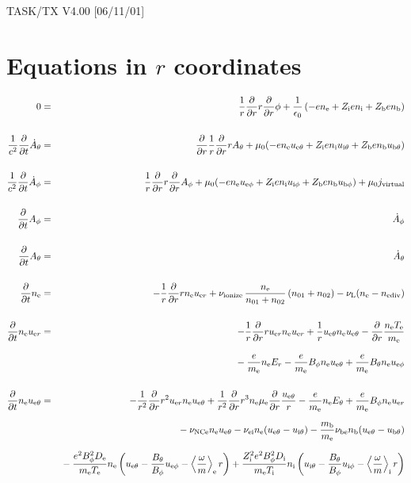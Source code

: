 \documentclass[11pt]{article}
\def\r#1{{\rm#1}}
\def\ddt{\frac{\partial}{\partial t}}
\def\ddr{\frac{\partial}{\partial r}}
\def\ave#1{\left\langle#1\right\rangle}
\def\me{m_\r{e}}
\def\mb{m_\r{b}}
\def\mue{\mu_\r{e}}
\def\De{D_\r{e}}
\def\Di{D_\r{i}}
\def\ne{n_\r{e}}
\def\ni{n_\r{i}}
\def\nb{n_\r{b}}
\def\uer{u_{\r{e}r}}
\def\ueth{u_{\r{e}\theta}}
\def\uith{u_{\r{i}\theta}}
\def\ubth{u_{\r{b}\theta}}
\def\ueph{u_{\r{e}\phi}}
\def\uiph{u_{\r{i}\phi}}
\def\ubph{u_{\r{b}\phi}}
\def\Er{E_r}
\def\Eth{E_\theta}
\def\Bth{B_\theta}
\def\Bph{B_\phi}
\def\Athd{\dot{A}_\theta}
\def\Aphd{\dot{A}_\phi}
\def\Ath{A_\theta}
\def\Aph{A_\phi}
\def\Te{T_\r{e}}
\def\Ti{T_\r{i}}
\def\nna{n_{01}}
\def\nnb{n_{02}}
\def\Zi{Z_\r{i}}
\def\Zb{Z_\r{b}}
\def\nuNCe{\nu_\r{NCe}}
\def\nuL{\nu_\r{L}}
\def\nuion{\nu_\r{ionize}}
\def\nediv{n_\r{ediv}}
\begin{document}
\begin{center}
TASK/TX V4.00 [06/11/01]
\end{center}

\section{Equations in $r$ coordinates}
\vspace{-5mm}

\begin{eqnarray}
%
%
  0 &=&
%
    \frac{1}{r} \ddr r \ddr \phi
%
  + \frac{1}{\epsilon_0}
%
    \left(-e \ne + \Zi e \ni + \Zb e \nb \right)
\\[5mm]
%
%
  \frac{1}{c^2} \ddt \Athd &=&
%
    \ddr \frac{1}{r} \ddr r \Ath
%
  + \mu_0 (-e \ne \ueth + \Zi e \ni \uith + \Zb e \nb \ubth)
\\[5mm]
%
%
  \frac{1}{c^2} \ddt \Aphd &=&
%
  \frac{1}{r} \ddr r \ddr \Aph
%
  + \mu_0 (-e \ne \ueph + \Zi e \ni \uiph + \Zb e \nb \ubph) + \mu_0 j_\r{virtual}
\\[5mm]
%
%
  \ddt \Aph &=&
%
  \Aphd
\\[5mm]
%
%
  \ddt \Ath &=&
%
  \Athd
\\[5mm]
%
%
  \ddt\ne &=&
%
  - \frac{1}{r} \ddr r \ne \uer 
%
  + \nuion\, \frac{\ne}{\nna+\nnb}\, (\nna+\nnb)
%
  - \nuL (\ne - \nediv)
\\[5mm]
%
%
  \ddt \ne \uer &=&
%
  - \frac{1}{r} \ddr r \uer \ne \uer
%
  + \frac{1}{r} \ueth \ne \ueth
%
  - \ddr \frac{\ne \Te}{\me}
\nonumber\\[3mm]&&{}
%
  - \frac{e}{\me} \ne \Er
%
  - \frac{e}{\me} \Bph \ne \ueth
%
  + \frac{e}{\me} \Bth \ne \ueph
\\[5mm]
%
%
  \ddt \ne \ueth &=&
%
  - \frac{1}{r^2} \ddr r^2 \uer \ne \ueth
%
  + \frac{1}{r^2} \ddr r^3 \ne \mue \ddr \frac{\ueth}{r}
%
  - \frac{e}{\me} \ne \Eth
%
  + \frac{e}{\me} \Bph \ne \uer
\nonumber\\[2.5mm]&&{}
%
  - \nuNCe \ne \ueth
%
  - \nu_\r{ei} \ne (\ueth - \uith)
%
  - \frac{\mb}{\me} \nu_\r{be} \nb (\ueth - \ubth)
\nonumber\\[2.5mm]&&{}
%
  - \frac{e^2 \Bph^2 \De}{\me\Te}\ne
    \left(\ueth - \frac{\Bth}{\Bph}\ueph - \ave{\frac{\omega}{m}}_\r{e}
     r \right)
%
   + \frac{\Zi^2 e^2 \Bph^2 \Di}{\me\Ti}\ni
    \left(\uith - \frac{\Bth}{\Bph}\uiph - \ave{\frac{\omega}{m}}_\r{i}
     r \right)
\nonumber\\[2.5mm]&&{}
%

\end{eqnarray}
\end{document}
